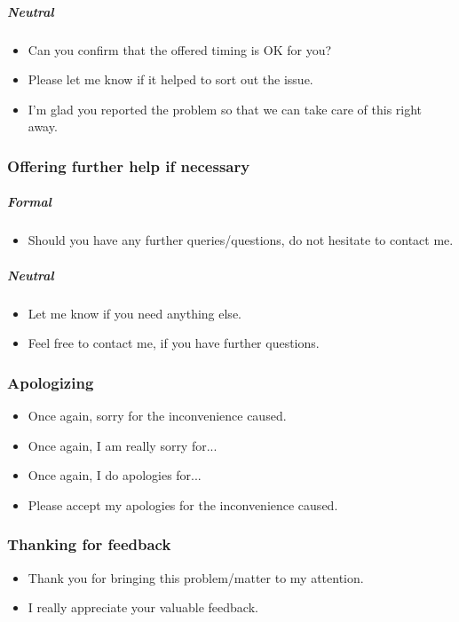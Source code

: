 \subparagraph{Neutral}
\begin{itemize}
\item Can you confirm that the offered timing is OK for you?
\item Please let me know if it helped to sort out the issue.
\item I'm glad you reported the problem so that we can take care of this right away.
\end{itemize}

\subsubsection{Offering further help if necessary}
\subparagraph{Formal}
\begin{itemize}
\item Should you have any further queries/questions, do not hesitate to contact me.
\end{itemize}

\subparagraph{Neutral}
\begin{itemize}
\item Let me know if you need anything else.
\item Feel free to contact me, if you have further questions.
\end{itemize}

\subsubsection{Apologizing}
\begin{itemize}
\item Once again, sorry for the inconvenience caused.
\item Once again, I am really sorry for...
\item Once again, I do apologies for...
\item Please accept my apologies for the inconvenience caused.
\end{itemize}

\subsubsection{Thanking for feedback}
\begin{itemize}
\item Thank you for bringing this problem/matter to my attention.
\item I really appreciate your valuable feedback.
\end{itemize}

